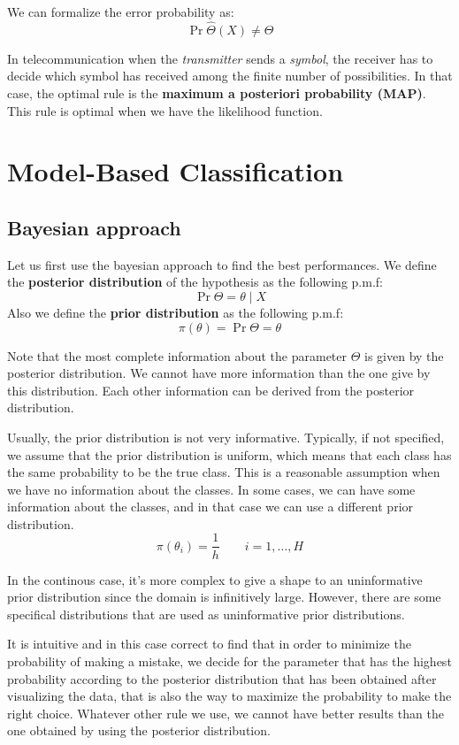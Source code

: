 We can formalize the error probability as:
\[
    \Pr{\hat{\Theta}(X) \neq \Theta }
\]

In telecommunication when the \textit{transmitter} sends a \textit{symbol}, the receiver has to decide which symbol has received among the finite number of possibilities. In that case, the optimal rule is the \textbf{maximum a posteriori probability (MAP)}. This rule is optimal when we have the likelihood function.

\section{Model-Based Classification}

\subsection{Bayesian approach}
Let us first use the bayesian approach to find the best performances. We define the \textbf{posterior distribution} of the hypothesis as the following p.m.f:
\[
    \Pr{\Theta = \theta \mid X}
\]
Also we define the \textbf{prior distribution} as the following p.m.f:
\[
    \pi(\theta) = \Pr{\Theta = \theta}
\]

Note that the most complete information about the parameter $\Theta$ is given by the posterior distribution. We cannot have more information than the one give by this distribution. Each other information can be derived from the posterior distribution.

Usually, the prior distribution is not very informative. Typically, if not specified, we assume that the prior distribution is uniform, which means that each class has the same probability to be the true class. This is a reasonable assumption when we have no information about the classes. In some cases, we can have some information about the classes, and in that case we can use a different prior distribution. 
\[
    \pi(\theta_i) = \frac 1h\qquad i = 1, \dots, H
\]

In the continous case, it's more complex to give a shape to an uninformative prior distribution since the domain is infinitively large. However, there are some specifical distributions that are used as uninformative prior distributions.

It is intuitive and in this case correct to find that in order to minimize the probability of making a mistake, we decide for the parameter that has the highest probability according to the posterior distribution that has been obtained after visualizing the data, that is also the way to maximize the probability to make the right choice. Whatever other rule we use, we cannot have better results than the one obtained by using the posterior distribution.

